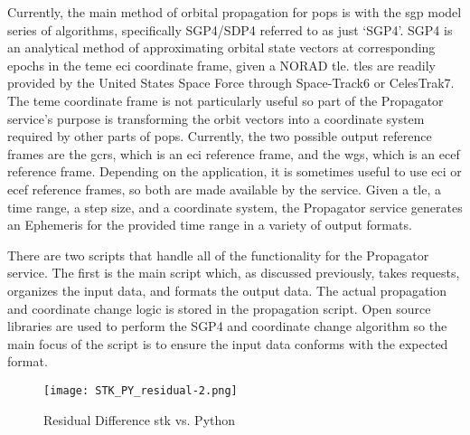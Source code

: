 Currently, the main method of orbital propagation for \gls{pops} is with the
\gls{sgp} model series of algorithms, specifically SGP4/SDP4 referred to as
just ‘SGP4’. SGP4 is an analytical method of approximating orbital state
vectors at corresponding epochs in the \gls{teme} \gls{eci} coordinate frame,
given a NORAD \gls{tle}.  \gls{tle}s are readily provided by the United States
Space Force through Space-Track6 or CelesTrak7. The \gls{teme} coordinate frame
is not particularly useful so part of the Propagator service’s purpose is
transforming the orbit vectors into a coordinate system required by other parts
of \gls{pops}.  Currently, the two possible output reference frames are the
\gls{gcrs}, which is an \gls{eci} reference frame, and the \gls{wgs}, which is
an \gls{ecef} reference frame.  Depending on the application, it is sometimes
useful to use \gls{eci} or \gls{ecef} reference frames, so both are made
available by the service.  Given a \gls{tle}, a time range, a step size, and a
coordinate system, the Propagator service generates an Ephemeris for the
provided time range in a variety of output formats.

There are two scripts that handle all of the functionality for the Propagator
service. The first is the main script which, as discussed previously, takes
requests, organizes the input data, and formats the output data. The actual
propagation and coordinate change logic is stored in the propagation script.
Open source libraries are used to perform the SGP4 and coordinate change
algorithm so the main focus of the script is to ensure the input data conforms
with the expected format.  

\begin{figure}[h]
    \centering
    \texttt{[image: STK\_PY\_residual-2.png]} 
    \caption{Residual Difference \gls{stk} vs. Python}
    \label{fig:stk_py} 
\end{figure}

